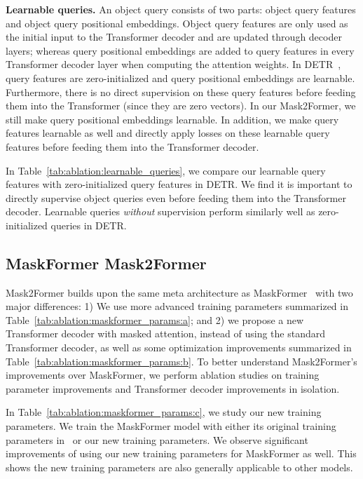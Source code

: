 \documentclass[10pt,twocolumn,letterpaper]{article}
\newcommand{\modelname}{Mask2Former\xspace}
\newcommand{\tabref}[1]{Table~\ref{#1}}
\begin{document}
\noindent\textbf{Learnable queries.}
An object query consists of two parts: object query features and object query positional embeddings. Object query features are only used as the initial input to the Transformer decoder and are updated through decoder layers; whereas query positional embeddings are added to query features in every Transformer decoder layer when computing the attention weights. In DETR~\cite{detr}, query features are zero-initialized and query positional embeddings are learnable. Furthermore, there is no direct supervision on these query features before feeding them into the Transformer (since they are zero vectors). In our \modelname, we still make query positional embeddings learnable. In addition, we make query features learnable as well and directly apply losses on these learnable query features before feeding them into the Transformer decoder.

In \tabref{tab:ablation:learnable_queries}, we compare our learnable query features with zero-initialized query features in DETR. We find it is important to directly supervise object queries even before feeding them into the Transformer decoder. Learnable queries \textit{without} supervision perform similarly well as zero-initialized queries in DETR.


\subsection{MaskFormer \vs \modelname}
\modelname builds upon the same meta architecture as MaskFormer~\cite{cheng2021maskformer} with two major differences: 1) We use more advanced training parameters summarized in \tabref{tab:ablation:maskformer_params:a}; and 2) we propose a new Transformer decoder with masked attention, instead of using the standard Transformer decoder, as well as some optimization improvements summarized in \tabref{tab:ablation:maskformer_params:b}. To better understand \modelname's improvements over MaskFormer, we perform ablation studies on training parameter improvements and Transformer decoder improvements in isolation.

In \tabref{tab:ablation:maskformer_params:c}, we study our new training parameters. We train the MaskFormer model with either its original training parameters in~\cite{cheng2021maskformer} or our new training parameters. We observe significant improvements of using our new training parameters for MaskFormer as well. This shows the new training parameters are also generally applicable to other models.
\end{document}
